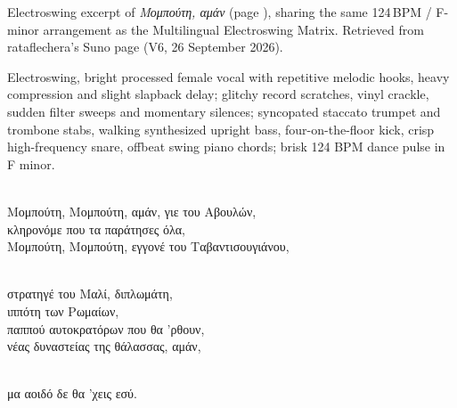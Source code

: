 
\begin{notes}
Electroswing excerpt of \emph{Μομπούτη, αμάν} (page \pageref{sec:mobouti-aman}), sharing the same 124\,BPM / F-minor arrangement as the Multilingual Electroswing Matrix. Retrieved from rataflechera's Suno page (V6, 26 September 2026).
\end{notes}
\begin{style}
Electroswing, bright processed female vocal with repetitive melodic hooks, heavy compression and slight slapback delay; glitchy record scratches, vinyl crackle, sudden filter sweeps and momentary silences; syncopated staccato trumpet and trombone stabs, walking synthesized upright bass, four-on-the-floor kick, crisp high-frequency snare, offbeat swing piano chords; brisk 124 BPM dance pulse in F minor.
\end{style}
\begin{lyrics}
\\
Μομπούτη, Μομπούτη, αμάν, γιε του Αβουλών,
\\
κληρονόμε που τα παράτησες όλα,
\\
Μομπούτη, Μομπούτη, εγγονέ του Ταβαντισουγιάνου,

\\
στρατηγέ του Μαλί, διπλωμάτη,\\
ιππότη των Ρωμαίων,\\
παππού αυτοκρατόρων που θα 'ρθουν,\\
νέας δυναστείας της θάλασσας, αμάν,

\\
μα αοιδό δε θα 'χεις εσύ.
\end{lyrics}

